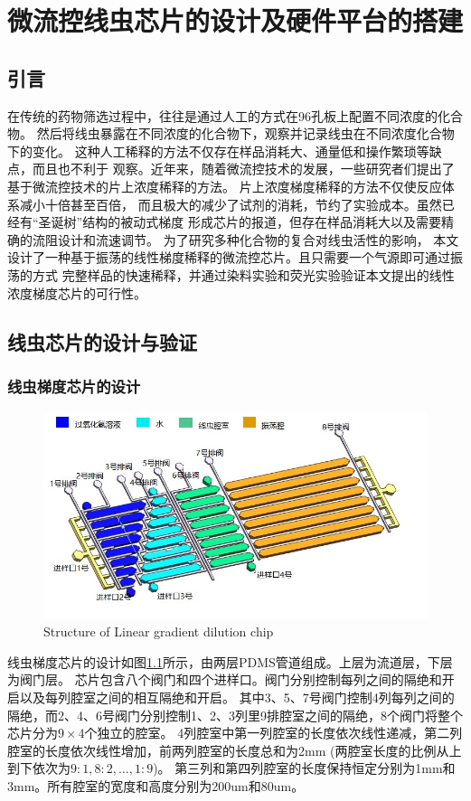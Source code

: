 \chapter{微流控线虫芯片的设计及硬件平台的搭建}
\section{引言}
	
	在传统的药物筛选过程中，往往是通过人工的方式在96孔板上配置不同浓度的化合物。
	然后将线虫暴露在不同浓度的化合物下，观察并记录线虫在不同浓度化合物下的变化。
	这种人工稀释的方法不仅存在样品消耗大、通量低和操作繁琐等缺点，而且也不利于
	观察。近年来，随着微流控技术的发展，一些研究者们提出了基于微流控技术的片上浓度稀释的方法。
	片上浓度梯度稀释的方法不仅使反应体系减小十倍甚至百倍，
	而且极大的减少了试剂的消耗，节约了实验成本。虽然已经有“圣诞树”结构的被动式梯度
	形成芯片的报道，但存在样品消耗大以及需要精确的流阻设计和流速调节。
	为了研究多种化合物的复合对线虫活性的影响，
	本文设计了一种基于振荡的线性梯度稀释的微流控芯片。且只需要一个气源即可通过振荡的方式
	完整样品的快速稀释，并通过染料实验和荧光实验验证本文提出的线性浓度梯度芯片的可行性。
	
\section{线虫芯片的设计与验证}
\subsection{线虫梯度芯片的设计}
\label{arch-design}
\begin{figure}[htbp]
	  \centering
	  \includegraphics[width=13cm]{figure/chap2/chip-arch.jpg}
		{Structure of Linear gradient dilution chip}
	  \label{fig:chap2:chip-arch}
	\end{figure}
线虫梯度芯片的设计如图\ref{fig:chap2:chip-arch}所示，由两层PDMS管道组成。上层为流道层，下层为阀门层。
芯片包含八个阀门和四个进样口。阀门分别控制每列之间的隔绝和开启以及每列腔室之间的相互隔绝和开启。
其中3、5、7号阀门控制4列每列之间的隔绝，而2、4、6号阀门分别控制1、2、3列里9排腔室之间的隔绝，8个阀门将整个芯片分为$9\times4$个独立的腔室。
4列腔室中第一列腔室的长度依次线性递减，第二列腔室的长度依次线性增加，前两列腔室的长度总和为2mm (两腔室长度的比例从上到下依次为$9:1,8:2,\dots,1:9$)。
第三列和第四列腔室的长度保持恒定分别为1mm和3mm。所有腔室的宽度和高度分别为200um和80um。

